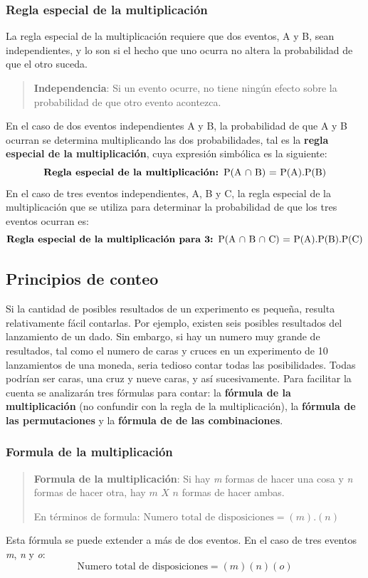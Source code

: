 \documentclass[]{article}
\begin{document}
\subsubsection*{Regla especial de la multiplicación}
La regla especial de la multiplicación requiere que dos eventos, A y B, sean independientes, y lo son si el hecho que uno ocurra no altera la probabilidad de que el otro suceda.
\begin{quote}
	\textbf{Independencia}: Si un evento ocurre, no tiene ningún efecto sobre la probabilidad de que otro evento acontezca.
\end{quote}
En el caso de dos eventos independientes A y B, la probabilidad de que A y B ocurran se determina multiplicando las dos probabilidades, tal es la \textbf{regla especial de la multiplicación}, cuya expresión simbólica es la siguiente:
\[ \text{\textbf{Regla especial de la multiplicación: }} \text{P(A $\cap$ B) = P(A).P(B)}\]
En el caso de tres eventos independientes, A, B y C, la regla especial de la multiplicación que se utiliza para determinar la probabilidad de que los tres eventos ocurran es:
\[ \text{\textbf{Regla especial de la multiplicación para 3: }} \text{P(A $\cap$ B $\cap$ C) = P(A).P(B).P(C)}\]

\subsection{Principios de conteo}
Si la cantidad de posibles resultados de un experimento es pequeña, resulta relativamente fácil contarlas. Por ejemplo, existen seis posibles resultados del lanzamiento de un dado. Sin embargo, si hay un numero muy grande de resultados, tal como el numero de caras y cruces en un experimento de 10 lanzamientos de una moneda, seria tedioso contar todas las posibilidades. Todas podrían ser caras, una cruz y nueve caras, y así sucesivamente.  Para facilitar la cuenta se analizarán tres fórmulas para contar: la \textbf{fórmula de la multiplicación} (no confundir con la regla de la multiplicación), la \textbf{fórmula de las permutaciones} y la \textbf{fórmula de de las combinaciones}.
\subsubsection*{Formula de la multiplicación}
\begin{quote}
	\textbf{Formula de la multiplicación}: Si hay \textit{m} formas de hacer una cosa y \textit{n} formas de hacer otra, hay $\textit{m } X\textit{ n}$ formas de hacer ambas.
	\item En términos de formula: $\text{Numero total de disposiciones} = (m).(n)$
\end{quote}
Esta fórmula se puede extender a más de dos eventos. En el caso de tres eventos \textit{m}, \textit{n} y \textit{o}:
\[ \text{Numero total de disposiciones} = (m)(n)(o) \]
\end{document}
